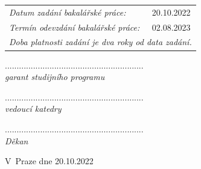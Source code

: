 \documentclass[11pt,a4paper]{article}
\begin{document}
\hspace{-1ex}\begin{tabular}{ll}
{\it Datum zadání bakalářské práce:}      & 20.10.2022\\[1mm]
{\it Termín odevzdání bakalářské práce:}  & 02.08.2023\\[1mm]
\multicolumn{2}{l}{\it Doba platnosti zadání je dva roky od data zadání.}
\end{tabular}

\vspace{4ex}

\parbox{0.40\textwidth}{%
\begin{center}
...........................................................\\
  {\it garant studijního programu}
\end{center}
}

\vspace{2ex}

\parbox{0.40\textwidth}{%
\begin{center}
...........................................................\\
  {\it vedoucí katedry}
\end{center}
}
\qquad\qquad
\parbox{0.40\textwidth}{%
\begin{center}
...........................................................\\
  {\it Děkan}
\end{center}
}

\vspace{2ex}

V~Praze dne   20.10.2022
\end{document}
